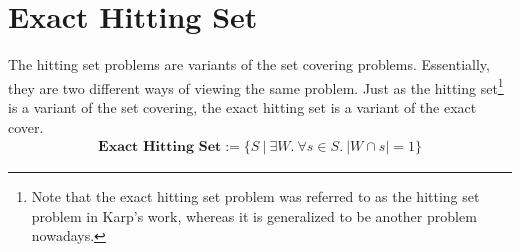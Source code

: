 \section{Exact Hitting Set}
The hitting set problems are variants of the set covering problems. Essentially, they are two different ways 
of viewing the same problem. Just as the hitting set\footnote{Note that the exact hitting set problem was referred to as the hitting set problem in Karp's work, whereas 
it is generalized to be another problem nowadays.} is a variant of the set covering, the exact hitting set is 
a variant of the exact cover. 
\begin{align*}
   \textbf{Exact Hitting Set} := \{S\ |\ \exists W.\ \forall s \in S.\ |W \cap s| = 1\}
\end{align*}
 

